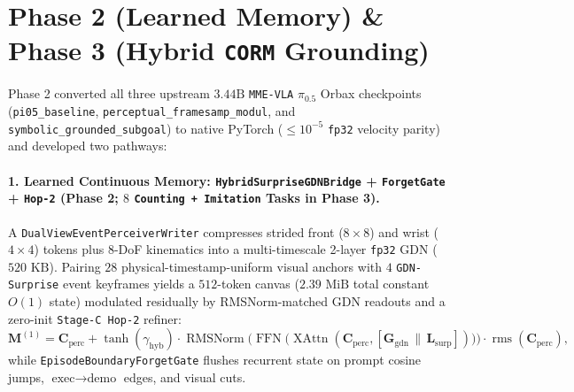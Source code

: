 \documentclass[10pt]{article}
\begin{document}
\section{Phase 2 (Learned Memory) \& Phase 3 (Hybrid \texttt{CORM} Grounding)}
Phase 2 converted all three upstream $3.44\text{B}$ \texttt{MME-VLA} $\pi_{0.5}$ Orbax checkpoints (\texttt{pi05\_baseline}, \texttt{perceptual\_\allowbreak framesamp\_\allowbreak modul}, and \texttt{symbolic\_\allowbreak grounded\_\allowbreak subgoal}) to native PyTorch ($\le 10^{-5}$ \texttt{fp32} velocity parity) and developed two pathways:

\paragraph{1. Learned Continuous Memory: \texttt{HybridSurpriseGDNBridge} + \texttt{ForgetGate} + \texttt{Hop-2} (Phase 2; $8$ \texttt{Counting + Imitation} Tasks in Phase 3).}
A \texttt{DualView\allowbreak Event\allowbreak PerceiverWriter} compresses strided front ($8\times 8$) and wrist ($4\times 4$) tokens plus 8-DoF kinematics into a multi-timescale 2-layer \texttt{fp32} GDN ($520\text{ KB}$). Pairing $28$ physical-timestamp-uniform visual anchors with $4$ \texttt{GDN-Surprise} event keyframes yields a $512$-token canvas ($2.39\text{ MiB}$ total constant $O(1)$ state) modulated residually by RMSNorm-matched GDN readouts and a zero-init \texttt{Stage-C Hop-2} refiner:
\begin{equation}
  \mathbf{M}^{(1)} = \mathbf{C}_{\mathrm{perc}} + \tanh(\gamma_{\mathrm{hyb}})\cdot \operatorname{RMSNorm}\!\Big(\operatorname{FFN}\big(\operatorname{XAttn}(\mathbf{C}_{\mathrm{perc}}, [\mathbf{G}_{\mathrm{gdn}} \,\|\, \mathbf{L}_{\mathrm{surp}}])\big)\Big)\cdot \operatorname{rms}(\mathbf{C}_{\mathrm{perc}}),
\end{equation}
while \texttt{Episode\allowbreak Boundary\allowbreak ForgetGate} flushes recurrent state on prompt cosine jumps, $\text{exec}\to\text{demo}$ edges, and visual cuts.
\end{document}
